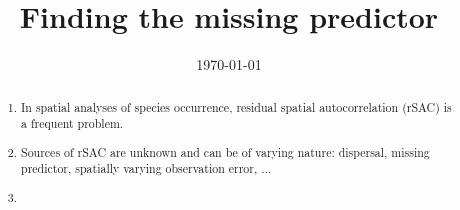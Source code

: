 \documentclass[11pt]{article}
\title{Finding the missing predictor}
\date{\today} %
\begin{document}
	\maketitle
	
	\begin{abstract}\bfseries
	\begin{enumerate}
		\item In spatial analyses of species occurrence, residual spatial autocorrelation (rSAC) is a frequent problem. 
		\item Sources of rSAC are unknown and can be of varying nature: dispersal, missing predictor, spatially varying observation error, ...
		\item 
	\end{enumerate}	
	\end{abstract} 
\end{document}
